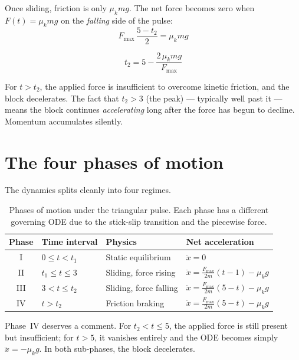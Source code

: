 \documentclass[11pt, a4paper]{article}
\begin{document}
Once sliding, friction is only $\mu_k m g$.  The net force becomes zero
when $F(t) = \mu_k m g$ on the \emph{falling} side of the pulse:
\begin{equation}
F_{\max}\,\frac{5 - t_2}{2} = \mu_k m g
\end{equation}

\begin{equation}
\boxed{t_2 = 5 - \frac{2\,\mu_k m g}{F_{\max}}}
\label{eq:t2}
\end{equation}

\noindent
For $t > t_2$, the applied force is insufficient to overcome kinetic friction,
and the block decelerates.  The fact that $t_2 > 3$ (the peak) --- typically
well past it --- means the block continues \emph{accelerating} long after the
force has begun to decline.  Momentum accumulates silently.

\section{The four phases of motion}
\label{sec:phases}

The dynamics splits cleanly into four regimes.

\begin{table}[H]
\centering
\caption{Phases of motion under the triangular pulse.  Each phase has a
         different governing ODE due to the stick-slip transition and
         the piecewise force.}
\label{tab:phases}
\begin{tabular}{@{}clll@{}}
\toprule
\textbf{Phase} & \textbf{Time interval} & \textbf{Physics} & \textbf{Net acceleration} \\
\midrule
I   & $0 \le t < t_1$     & Static equilibrium     & $\ddot{x} = 0$ \\[3pt]
II  & $t_1 \le t \le 3$   & Sliding, force rising   & $\ddot{x} = \frac{F_{\max}}{2m}(t-1) - \mu_k g$ \\[3pt]
III & $3 < t \le t_2$     & Sliding, force falling  & $\ddot{x} = \frac{F_{\max}}{2m}(5-t) - \mu_k g$ \\[3pt]
IV  & $t > t_2$           & Friction braking        & $\ddot{x} = \frac{F_{\max}}{2m}(5-t) - \mu_k g$ \\
\bottomrule
\end{tabular}
\end{table}

\noindent
Phase~IV deserves a comment.  For $t_2 < t \le 5$, the applied force is still
present but insufficient; for $t > 5$, it vanishes entirely and the ODE becomes
simply $\ddot{x} = -\mu_k g$.  In both sub-phases, the block decelerates.
\end{document}
